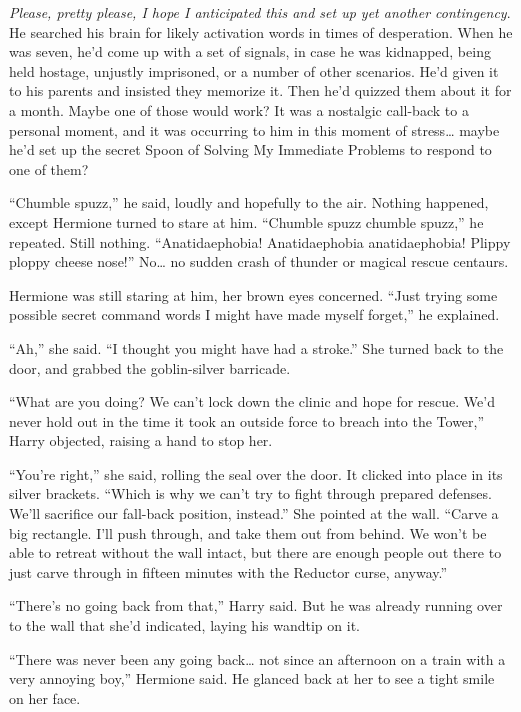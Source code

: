 \emph{Please, pretty please, I hope I anticipated this and set up yet
another contingency}. He searched his brain for likely activation words
in times of desperation. When he was seven, he'd come up with a set of
signals, in case he was kidnapped, being held hostage, unjustly
imprisoned, or a number of other scenarios. He'd given it to his parents
and insisted they memorize it. Then he'd quizzed them about it for a
month. Maybe one of those would work? It was a nostalgic call-back to a
personal moment, and it was occurring to him in this moment of
stress\ldots{} maybe he'd set up the secret Spoon of Solving My
Immediate Problems to respond to one of them?

``Chumble spuzz,'' he said, loudly and hopefully to the air. Nothing
happened, except Hermione turned to stare at him. ``Chumble spuzz
chumble spuzz,'' he repeated. Still nothing. ``Anatidaephobia!
Anatidaephobia anatidaephobia! Plippy ploppy cheese nose!'' No\ldots{}
no sudden crash of thunder or magical rescue centaurs.

Hermione was still staring at him, her brown eyes concerned. ``Just
trying some possible secret command words I might have made myself
forget,'' he explained.

``Ah,'' she said. ``I thought you might have had a stroke.'' She turned
back to the door, and grabbed the goblin-silver barricade.

``What are you doing? We can't lock down the clinic and hope for rescue.
We'd never hold out in the time it took an outside force to breach into
the Tower,'' Harry objected, raising a hand to stop her.

``You're right,'' she said, rolling the seal over the door. It clicked
into place in its silver brackets. ``Which is why we can't try to fight
through prepared defenses. We'll sacrifice our fall-back position,
instead.'' She pointed at the wall. ``Carve a big rectangle. I'll push
through, and take them out from behind. We won't be able to retreat
without the wall intact, but there are enough people out there to just
carve through in fifteen minutes with the Reductor curse, anyway.''

``There's no going back from that,'' Harry said. But he was already
running over to the wall that she'd indicated, laying his wandtip on it.

``There was never been any going back\ldots{} not since an afternoon on
a train with a very annoying boy,'' Hermione said. He glanced back at
her to see a tight smile on her face.

